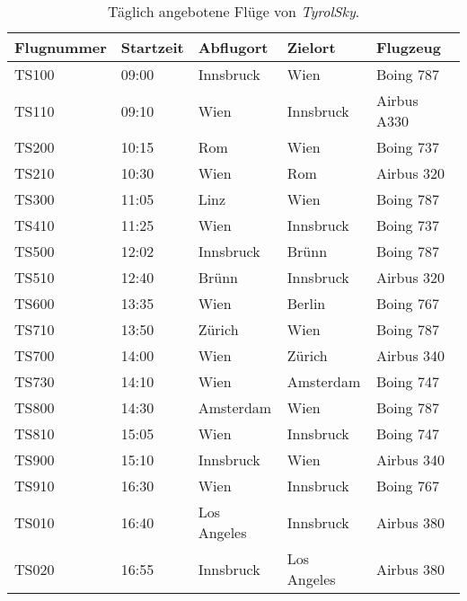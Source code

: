 \begin{table}
  \centering
  \begin{tabular}{lllll}
  Flugnummer & Startzeit & Abflugort     & Zielort    & Flugzeug    \\ \hline  %
    TS100  & 09:00   & Innsbruck     & Wien     & Boing 787   \\      %
    TS110  & 09:10   & Wien       & Innsbruck   & Airbus A330  \\      %
    TS200  & 10:15   & Rom        & Wien     & Boing 737   \\      %
    TS210  & 10:30   & Wien     	& Rom      & Airbus 320   \\      %
    TS300  & 11:05   & Linz       & Wien     & Boing 787   \\      %
    TS410  & 11:25   & Wien       & Innsbruck   & Boing 737   \\      %
    TS500  & 12:02   & Innsbruck     & Brünn     & Boing 787   \\      %
    TS510  & 12:40   & Brünn       & Innsbruck   & Airbus 320   \\      %
    TS600  & 13:35   & Wien       & Berlin    & Boing 767   \\      %
    TS710  & 13:50   & Zürich      & Wien     & Boing 787   \\      %
    TS700  & 14:00   & Wien       & Zürich    & Airbus 340   \\      %
    TS730  & 14:10   & Wien       & Amsterdam   & Boing 747   \\      %
    TS800  & 14:30   & Amsterdam     & Wien     & Boing 787   \\      %
    TS810  & 15:05   & Wien       & Innsbruck   & Boing 747   \\      %
    TS900  & 15:10   & Innsbruck     & Wien     & Airbus 340   \\      %
    TS910  & 16:30   & Wien       & Innsbruck   & Boing 767   \\      %
    TS010  & 16:40   & Los Angeles    & Innsbruck   & Airbus 380   \\      %
    TS020  & 16:55   & Innsbruck     & Los Angeles  & Airbus 380   \\     %
  \end{tabular}
  \caption{Täglich angebotene Flüge von \textit{TyrolSky}.}
  \label{tab:TyrolSky:destinations}
\end{table} 

